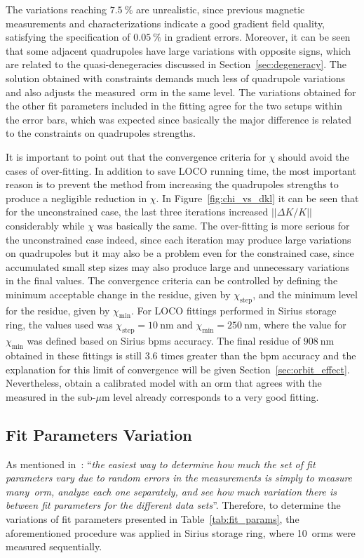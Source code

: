 The variations reaching $\SI{7.5}{\%}$ are unrealistic, since previous magnetic measurements and characterizations indicate a good gradient field quality, satisfying the specification of $\SI{0.05}{\%}$ in gradient errors. Moreover, it can be seen that some adjacent quadrupoles have large variations with opposite signs, which are related to the quasi-denegeracies discussed in Section~\ref{sec:degeneracy}. The solution obtained with constraints demands much less of quadrupole variations and also adjusts the measured~\gls{orm} in the same level. The variations obtained for the other fit parameters included in the fitting agree for the two setups within the error bars, which was expected since basically the major difference is related to the constraints on quadrupoles strengths.

It is important to point out that the convergence criteria for $\chi$ should avoid the cases of over-fitting. In addition to save LOCO running time, the most important reason is to prevent the method from increasing the quadrupoles strengths to produce a negligible reduction in $\chi$. In Figure~\ref{fig:chi_vs_dkl} it can be seen that for the unconstrained case, the last three iterations increased $||\Delta K/K||$ considerably while $\chi$ was basically the same. The over-fitting is more serious for the unconstrained case indeed, since each iteration may produce large variations on quadrupoles but it may also be a problem even for the constrained case, since accumulated small step sizes may also produce large and unnecessary variations in the final values. The convergence criteria can be controlled by defining the minimum acceptable change in the residue, given by $\chi_{\mathrm{step}}$, and the minimum level for the residue, given by $\chi_{\mathrm{min}}$. For LOCO fittings performed in Sirius storage ring, the values used was $\chi_{\mathrm{step}} = \SI{10}{\nano\meter}$ and $\chi_{\mathrm{min}} = \SI{250}{\nano\meter}$, where the value for $\chi_{\mathrm{min}}$ was defined based on Sirius \glspl{bpm} accuracy. The final residue of $\SI{908}{\nano\meter}$ obtained in these fittings is still $3.6$ times greater than the \gls{bpm} accuracy and the explanation for this limit of convergence will be given Section~\ref{sec:orbit_effect}. Nevertheless, obtain a calibrated model with an \gls{orm} that agrees with the measured in the sub-$\mu$m level already corresponds to a very good fitting.

\subsection{Fit Parameters Variation}\label{subsec:fit_var}
As mentioned in~\cite{safranek1997}: ``\textit{the easiest way to determine how much the set of fit parameters vary due to random errors in the measurements is simply to measure many~\gls{orm}, analyze each one separately, and see how much variation there is between fit parameters for the different data sets}''. Therefore, to determine the variations of fit parameters presented in Table~\ref{tab:fit_params}, the aforementioned procedure was applied in Sirius storage ring, where 10~\glspl{orm} were measured sequentially. 

